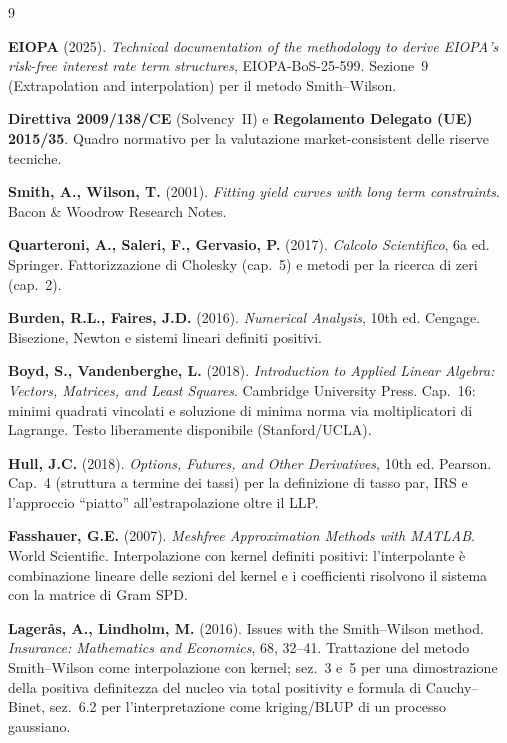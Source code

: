 \documentclass[11pt,a4paper]{article}
\theoremstyle{plain}
\theoremstyle{definition}
\theoremstyle{remark}
\begin{document}
\renewcommand{\refname}{Riferimenti bibliografici}
\begin{thebibliography}{9}

  \textbf{EIOPA} (2025).
  \textit{Technical documentation of the methodology to derive EIOPA's risk-free interest rate
  term structures}, EIOPA-BoS-25-599.
  Sezione~9 (Extrapolation and interpolation) per il metodo Smith--Wilson.

  \textbf{Direttiva 2009/138/CE} (Solvency~II) e
  \textbf{Regolamento Delegato (UE) 2015/35}.
  Quadro normativo per la valutazione market-consistent delle riserve tecniche.

  \textbf{Smith, A., Wilson, T.} (2001).
  \textit{Fitting yield curves with long term constraints}.
  Bacon \& Woodrow Research Notes.

  \textbf{Quarteroni, A., Saleri, F., Gervasio, P.} (2017).
  \textit{Calcolo Scientifico}, 6a ed. Springer.
  Fattorizzazione di Cholesky (cap.~5) e metodi per la ricerca di zeri (cap.~2).

  \textbf{Burden, R.L., Faires, J.D.} (2016).
  \textit{Numerical Analysis}, 10th ed. Cengage.
  Bisezione, Newton e sistemi lineari definiti positivi.

  \textbf{Boyd, S., Vandenberghe, L.} (2018).
  \textit{Introduction to Applied Linear Algebra: Vectors, Matrices, and Least Squares}.
  Cambridge University Press.
  Cap.~16: minimi quadrati vincolati e soluzione di minima norma via moltiplicatori di
  Lagrange. Testo liberamente disponibile (Stanford/UCLA).

  \textbf{Hull, J.C.} (2018).
  \textit{Options, Futures, and Other Derivatives}, 10th ed. Pearson.
  Cap.~4 (struttura a termine dei tassi) per la definizione di tasso par, IRS e
  l'approccio ``piatto'' all'estrapolazione oltre il LLP.

  \textbf{Fasshauer, G.E.} (2007).
  \textit{Meshfree Approximation Methods with MATLAB}. World Scientific.
  Interpolazione con kernel definiti positivi: l'interpolante \`e combinazione lineare delle
  sezioni del kernel e i coefficienti risolvono il sistema con la matrice di Gram SPD.

  \textbf{Lager\aa s, A., Lindholm, M.} (2016).
  Issues with the Smith--Wilson method.
  \textit{Insurance: Mathematics and Economics}, 68, 32--41.
  Trattazione del metodo Smith--Wilson come interpolazione con kernel; sez.~3 e~5 per una
  dimostrazione della positiva definitezza del nucleo via total positivity e formula di
  Cauchy--Binet, sez.~6.2 per l'interpretazione come kriging/BLUP di un processo gaussiano.


\end{thebibliography}
\end{document}
